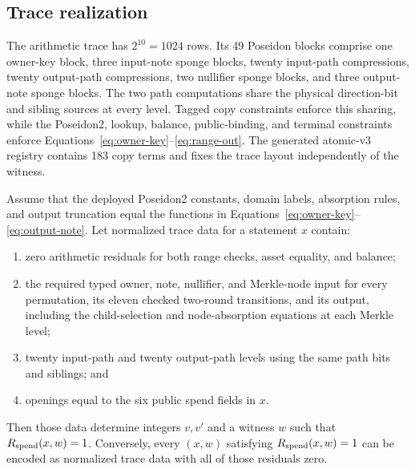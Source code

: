 \subsection{Trace realization}

The arithmetic trace has \(2^{10}=1024\) rows.  Its 49 Poseidon blocks comprise
one owner-key block, three input-note sponge blocks, twenty input-path
compressions, twenty output-path compressions, two nullifier sponge blocks,
and three output-note sponge blocks.  The two
path computations share the physical direction-bit and sibling sources at
every level.  Tagged copy constraints enforce this sharing, while the
Poseidon2, lookup, balance, public-binding, and terminal constraints enforce
Equations~\eqref{eq:owner-key}--\eqref{eq:range-out}.  The generated atomic-v3
registry contains 183 copy terms and fixes the trace layout independently of
the witness.

\begin{proposition}
\label{prop:relation-realization}
Assume that the deployed Poseidon2 constants, domain labels, absorption rules,
and output truncation equal the functions in
Equations~\eqref{eq:owner-key}--\eqref{eq:output-note}.  Let normalized trace
data for a statement \(x\) contain:
\begin{enumerate}[label=(\roman*)]
  \item zero arithmetic residuals for both range checks, asset equality, and
  balance;
  \item the required typed owner, note, nullifier, and Merkle-node input for
  every permutation, its eleven checked two-round transitions, and its output,
  including the child-selection and node-absorption equations at each Merkle
  level;
  \item twenty input-path and twenty output-path levels using the same path
  bits and siblings; and
  \item openings equal to the six public spend fields in \(x\).
\end{enumerate}
Then those data determine integers \(v,v'\) and a witness \(w\) such that
\(R_{\mathrm{spend}}(x,w)=1\).  Conversely, every \((x,w)\) satisfying
\(R_{\mathrm{spend}}(x,w)=1\) can be encoded as normalized trace data with all of those
residuals zero.
\end{proposition}

